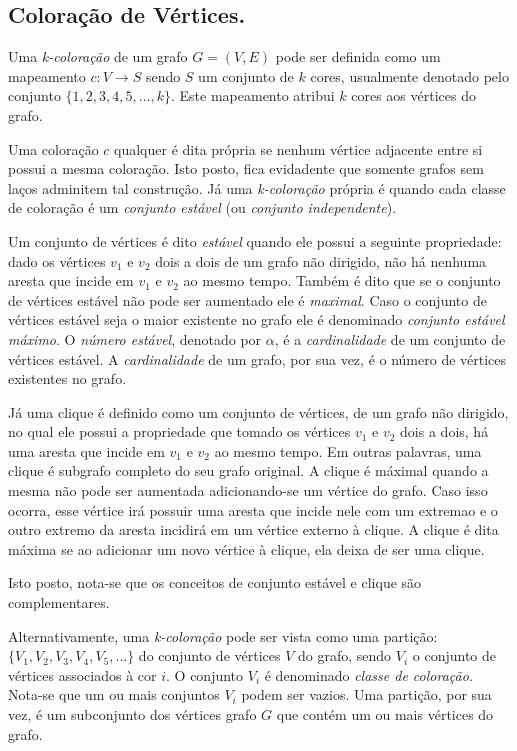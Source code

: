 \documentclass[12pt]{article}
\begin{document}
\subsection{Coloração de Vértices.}

Uma \emph{k-coloração} de um grafo $G =(V, E)$ pode ser definida como um mapeamento $c: V \rightarrow S$ sendo $S$ um conjunto de $k$ cores, usualmente denotado pelo conjunto $\{1, 2, 3, 4, 5, ..., k\}$. Este mapeamento atribui $k$ cores aos vértices do grafo.

Uma coloração $c$ qualquer é dita própria se nenhum vértice adjacente entre si possui a mesma coloração. Isto posto, fica evidadente que somente grafos sem laços adminitem tal construção. Já uma \emph{k-coloração} própria é quando cada classe de coloração é um \emph{conjunto estável} (ou \emph{conjunto independente}).

Um conjunto de vértices é dito \emph{estável} quando ele possui a seguinte propriedade: dado os vértices $v_1$ e $v_2$ dois a dois de um grafo não dirigido, não há nenhuma aresta que incide em $v_1$ e $v_2$ ao mesmo tempo. Também é dito que se o conjunto de vértices estável não pode ser aumentado ele é \emph{maximal}. Caso o conjunto de vértices estável seja o maior existente no grafo ele é denominado \emph{conjunto estável máximo}. O \emph{número estável}, denotado por $\alpha$, é a \emph{cardinalidade} de um conjunto de vértices estável. A \emph{cardinalidade} de um grafo, por sua vez, é o número de vértices existentes no grafo.

Já uma clique é definido como um conjunto de vértices, de um grafo não dirigido, no qual ele possui a propriedade que tomado os vértices $v_1$ e $v_2$ dois a dois, há uma aresta que incide em $v_1$ e $v_2$ ao mesmo tempo. Em outras palavras, uma clique é subgrafo completo do seu grafo original. A clique é máximal quando a mesma não pode ser aumentada adicionando-se um vértice do grafo. Caso isso ocorra, esse vértice irá possuir uma aresta que incide nele com um extremao e o outro extremo da aresta incidirá em um vértice externo à clique. A clique é dita máxima se ao adicionar um novo vértice à clique, ela deixa de ser uma clique.

Isto posto, nota-se que os conceitos de conjunto estável e clique são complementares.

Alternativamente, uma \emph{k-coloração} pode ser vista como uma partição: $\{V_1, V_2, V_3, V_4, V_5, ...\}$ do conjunto de vértices $V$ do grafo, sendo $V_i$ o conjunto de vértices associados à cor $i$. O conjunto $V_i$ é denominado \emph{classe de coloração}. Nota-se que um ou mais conjuntos $V_i$ podem ser vazios. Uma partição, por sua vez, é um subconjunto dos vértices grafo $G$ que contém um ou mais vértices do grafo.
\end{document}
